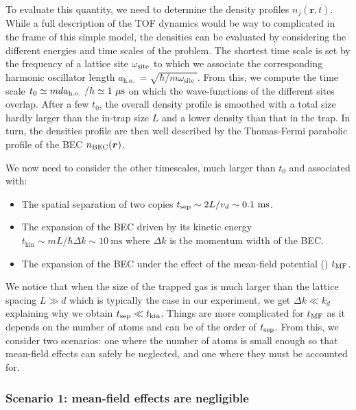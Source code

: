 To evaluate this quantity, we need to determine the density profiles $n_{j}(\bm{r}, t)$. While a full description of the TOF dynamics would be way to complicated in the frame of this simple model, the densities can be evaluated by considering the different energies and time scales of the problem. The shortest time scale is set by the frequency of a lattice site $\omega_{\rm{site}}$ to which we associate the corresponding harmonic oscillator length $a_{\text {h.o. }}=\sqrt{\hbar / m \omega_{\text {site }}}$. From this, we compute the time scale $t_0 \simeq m d a_{\text {h.o. }} /h \simeq 1 \ \mu \rm{s}$ on which the wave-functions of the different sites overlap. After a few $t_0$, the overall density profile is smoothed with a total size hardly larger than the in-trap size $L$ and a lower density than that in the trap. In turn, the densities profile are then well described by the Thomas-Fermi parabolic profile of the BEC $n_{\rm{BEC}}(\bm{r})$.

We now need to consider the other timescales, much larger than $t_0$ and associated with:

\begin{itemize}
    \item The spatial separation of two copies $t_{\rm{sep}} \sim 2L/v_d \sim 0.1 \ \rm{ms}$.
    \item The expansion of the BEC driven by its kinetic energy $t_{\mathrm{kin}} \sim m L / \hbar \Delta k \sim 10 \mathrm{~ms}$ where $\Delta k$ is the momentum width of the BEC.
    \item The expansion of the BEC under the effect of the mean-field potential () $t_{\rm{MF}}$.
\end{itemize}

\noindent We notice that when the size of the trapped gas is much larger than the lattice spacing $L \gg d$ which is typically the case in our experiment, we get $\Delta k \ll k_d$ explaining why we obtain $t_{\rm{sep}} \ll t_{\rm{kin}}$. Things are more complicated for $t_{\rm{MF}}$ as it depends on the number of atoms and can be of the order of $t_{\rm{sep}}$. From this, we consider two scenarios: one where the number of atoms is small enough so that mean-field effects can safely be neglected, and one where they must be accounted for.

\subsubsection{Scenario 1: mean-field effects are negligible}

